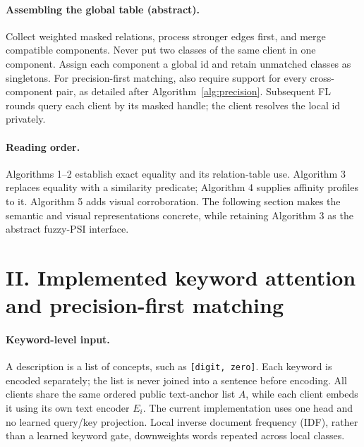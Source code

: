 \documentclass[11pt]{article}
\begin{document}
\paragraph{Assembling the global table (abstract).}
Collect weighted masked relations, process stronger edges first, and merge
compatible components. Never put two classes of the same client in one
component. Assign each component a global id and retain unmatched classes as
singletons. For precision-first matching, also require support for every
cross-component pair, as detailed after Algorithm~\ref{alg:precision}.
Subsequent FL rounds query each client by its masked handle; the client
resolves the local id privately.

\paragraph{Reading order.}
Algorithms 1--2 establish exact equality and its relation-table use.
Algorithm 3 replaces equality with a similarity predicate; Algorithm 4 supplies
affinity profiles to it. Algorithm 5 adds visual corroboration.
The following section makes the semantic and visual representations concrete,
while retaining Algorithm 3 as the abstract fuzzy-PSI interface.

\clearpage
\section*{II. Implemented keyword attention and precision-first matching}
\paragraph{Keyword-level input.}
A description is a list of concepts, such as \texttt{[digit, zero]}.
Each keyword is encoded separately; the list is never joined into a sentence
before encoding. All clients share the same ordered public text-anchor list
$A$, while each client embeds it using its own text encoder $E_i$.
The current implementation uses one head and no learned query/key projection.
Local inverse document frequency (IDF), rather than a learned keyword gate,
downweights words repeated across local classes.
\end{document}

